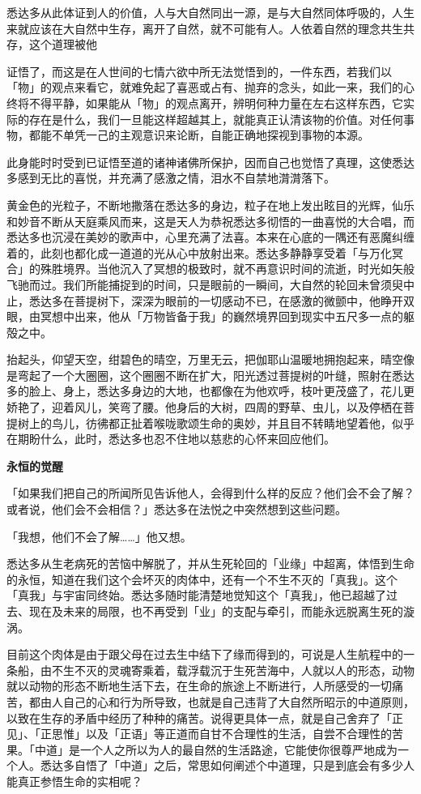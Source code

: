 \documentclass[twoside,openany]{book}
\newcommand{\mt}[1]{\textbullet \textbf{#1}}
\begin{document}
悉达多从此体证到人的价值，人与大自然同出一源，是与大自然同体呼吸的，人生来就应该在大自然中生存，离开了自然，就不可能有人。人依着自然的理念共生共存，这个道理被他





证悟了，而这是在人世间的七情六欲中所无法觉悟到的，一件东西，若我们以「物」的观点来看它，就难免起了喜恶或占有、抛弃的念头，如此一来，我们的心终将不得平静，如果能从「物」的观点离开，辨明何种力量在左右这样东西，它实际的存在是什么，我们一旦能这样超越其上，就能真正认清该物的价值。对任何事物，都能不单凭一己的主观意识来论断，自能正确地探视到事物的本源。

此身能时时受到已证悟至道的诸神诸佛所保护，因而自己也觉悟了真理，这使悉达多感到无比的喜悦，并充满了感激之情，泪水不自禁地潸潸落下。

黄金色的光粒子，不断地撒落在悉达多的身边，粒子在地上发出眩目的光辉，仙乐和妙音不断从天庭乘风而来，这是天人为恭祝悉达多彻悟的一曲喜悦的大合唱，而悉达多也沉浸在美妙的歌声中，心里充满了法喜。本来在心底的一隅还有恶魔纠缠着的，此刻也都化成一道道的光从心中放射出来。悉达多静静享受着「与万化冥合」的殊胜境界。当他沉入了冥想的极致时，就不再意识时间的流逝，时光如矢般飞驰而过。我们所能捕捉到的时间，只是眼前的一瞬间，大自然的轮回未曾须臾中止，悉达多在菩提树下，深深为眼前的一切感动不已，在感激的微颤中，他睁开双眼，由冥想中出来，他从「万物皆备于我」的巍然境界回到现实中五尺多一点的躯殻之中。

抬起头，仰望天空，绀碧色的晴空，万里无云，把伽耶山温暖地拥抱起来，晴空像是弯起了一个大圈圈，这个圈圈不断在扩大，阳光透过菩提树的叶缝，照射在悉达多的脸上、身上，悉达多身边的大地，也都像在为他欢呼，枝叶更茂盛了，花儿更娇艳了，迎着风儿，笑弯了腰。他身后的大树，四周的野草、虫儿，以及停栖在菩提树上的鸟儿，彷彿都正扯着喉咙歌颂生命的奥妙，并且目不转睛地望着他，似乎在期盼什么，此时，悉达多也忍不住地以慈悲的心怀来回应他们。

\mt{永恒的觉醒}

「如果我们把自己的所闻所见告诉他人，会得到什么样的反应？他们会不会了解？或者说，他们会不会相信？」悉达多在法悦之中突然想到这些问题。

「我想，他们不会了解……」他又想。

悉达多从生老病死的苦恼中解脱了，并从生死轮回的「业缘」中超离，体悟到生命的永恒，知道在我们这个会坏灭的肉体中，还有一个不生不灭的「真我」。这个「真我」与宇宙同终始。悉达多随时能清楚地觉知这个「真我」，他已超越了过去、现在及未来的局限，也不再受到「业」的支配与牵引，而能永远脱离生死的漩涡。

目前这个肉体是由于跟父母在过去生中结下了缘而得到的，可说是人生航程中的一条船，由不生不灭的灵魂寄乘着，载浮载沉于生死苦海中，人就以人的形态，动物就以动物的形态不断地生活下去，在生命的旅途上不断进行，人所感受的一切痛苦，都由人自己的心和行为所导致，也就是自己违背了大自然所昭示的中道原则，以致在生存的矛盾中经历了种种的痛苦。说得更具体一点，就是自己舍弃了「正见」、「正思惟」以及「正语」等正道而自甘不合理性的生活，自尝不合理性的苦果。「中道」是一个人之所以为人的最自然的生活路途，它能使你很尊严地成为一个人。悉达多自悟了「中道」之后，常思如何阐述个中道理，只是到底会有多少人能真正参悟生命的实相呢？
\end{document}
